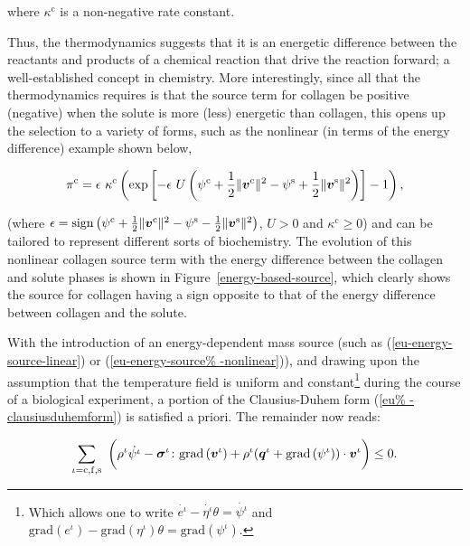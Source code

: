 \noindent where $\kappa^{\mathrm{c}}$ is a non-negative rate
constant.

Thus, the thermodynamics suggests that it is an energetic difference
between the reactants and products of a chemical reaction that drive
the reaction forward; a well-established concept in
chemistry. More interestingly, since all that the thermodynamics
requires is that the source term for collagen be positive (negative)
when the solute is more (less) energetic than collagen, this opens up
the selection to a variety of forms, such as the nonlinear (in terms
of the energy difference) example shown below,

\begin{equation}
\pi^{\mathrm{c}}=\epsilon\ \kappa^{\mathrm{c}}\left( \mathrm{exp}
\left[-\epsilon\ U \left(\psi^{\mathrm{c}}+\frac{1}{2}
  \Vert\bv^{\mathrm{c}}\Vert^2 - \psi^{\mathrm{s}}+\frac{1}{2}
  \Vert\bv^{\mathrm{s}}\Vert^2\right) \right] - 1\right),
\label{eu-energy-source-nonlinear}
\end{equation}

\noindent (where $\epsilon =
\mathrm{sign}\left(\psi^{\mathrm{c}}+\frac{1}{2}
\Vert\mbox{\boldmath$ v$}^{\mathrm{c}}\Vert^2 - \psi^{\mathrm{s}}-\frac{1}{2}
\Vert\mbox{\boldmath$ v$}^{\mathrm{s}}\Vert^2\right)$, $U>0$ and
$\kappa^{\mathrm{c}}\geq 0$) and can be tailored to represent
different sorts of biochemistry. The evolution of this nonlinear
collagen source term with the energy difference between the collagen
and solute phases is shown in Figure~\ref{energy-based-source}, which
clearly shows the source for collagen having a sign opposite to that
of the energy difference between collagen and the solute.

With the introduction of an energy-dependent mass source (such as
(\ref{eu-energy-source-linear}) or (\ref{eu-energy-source%
  -nonlinear})), and drawing upon the assumption that the temperature
field is uniform and constant\footnote{Which allows one to write
  $\dot{e^{\iota}} - \dot{\eta^{\iota}} \theta = \dot{\psi^{\iota}}$
  and $\mathrm{grad} \left(e^{\iota}\right) -
  \mathrm{grad}\left(\eta^{\iota} \right)\theta =
  \mathrm{grad}\left(\psi^{\iota} \right)$.} during the course of a
biological experiment, a portion of the Clausius-Duhem form (\ref{eu%
  -clausiusduhemform}) is satisfied a priori. The remainder now reads:

\begin{equation}
\sum\limits_{\iota=\mathrm{c},\mathrm{f},\mathrm{s}}\ \bigg(\rho^{\iota}
\dot{\psi^{\iota}}
-\Bsigma^{\iota}\colon\mathrm{grad}\left(\bv^{\iota}\right)+
\rho^{\iota} (\bq^{\iota}+\mathrm{grad}\left(\psi^{\iota}\right))
\cdot\bv^{\iota} \bigg) \leq 0.
\label{eu-reduced-dissipation-1}
\end{equation}

